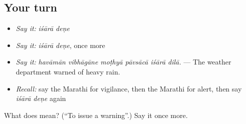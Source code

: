 \subsection*{Your turn}
\begin{itemize}
\raggedright
  \item \emph{Say it:} \emph{iśārā deṇe}
  \item \emph{Say it:} \emph{iśārā deṇe}, once more
  \item \emph{Say it:} \emph{havāmān vibhāgāne moṭhyā pāvsācā iśārā dilā.} — The weather department warned of heavy rain.
  \item \emph{Recall:} say the Marathi for vigilance, then the Marathi for alert, then say \emph{iśārā deṇe} again
\end{itemize}

\begin{tcolorbox}[breakable,colback=teal!4,colframe=teal!35!black,title={Before you move on}]
What does   mean? (\textquotedblleft{}To issue a warning\textquotedblright{}.) Say it once more.
\end{tcolorbox}
